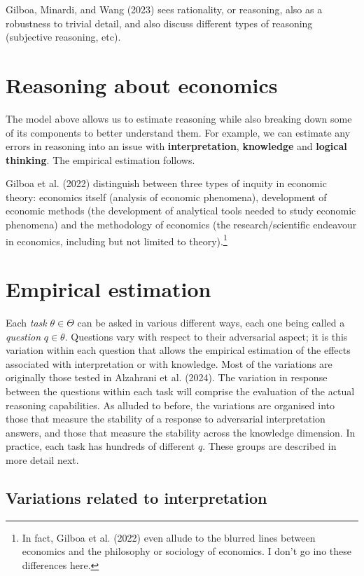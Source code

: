 \documentclass[
]{article}
\begin{document}
Gilboa, Minardi, and Wang (2023) sees rationality, or reasoning, also as
a robustness to trivial detail, and also discuss different types of
reasoning (subjective reasoning, etc).

\section{Reasoning about economics}\label{reasoning-about-economics}

The model above allows us to estimate reasoning while also breaking down
some of its components to better understand them. For example, we can
estimate any errors in reasoning into an issue with
\textbf{interpretation}, \textbf{knowledge} and \textbf{logical
thinking}. The empirical estimation follows.

Gilboa et al. (2022) distinguish between three types of inquity in
economic theory: economics itself (analysis of economic phenomena),
development of economic methods (the development of analytical tools
needed to study economic phenomena) and the methodology of economics
(the research/scientific endeavour in economics, including but not
limited to theory).\footnote{In fact, Gilboa et al. (2022) even allude
  to the blurred lines between economics and the philosophy or sociology
  of economics. I don't go ino these differences here.}

\section{Empirical estimation}\label{empirical-estimation}

Each \emph{task} \(\theta \in \Theta\) can be asked in various different
ways, each one being called a \emph{question} \(q \in \theta\).
Questions vary with respect to their adversarial aspect; it is this
variation within each question that allows the empirical estimation of
the effects associated with interpretation or with knowledge. Most of
the variations are originally those tested in Alzahrani et al. (2024).
The variation in response between the questions within each task will
comprise the evaluation of the actual reasoning capabilities. As alluded
to before, the variations are organised into those that measure the
stability of a response to adversarial interpretation answers, and those
that measure the stability across the knowledge dimension. In practice,
each task has hundreds of different \(q\). These groups are described in
more detail next.

\subsection{Variations related to
interpretation}\label{variations-related-to-interpretation}
\end{document}
